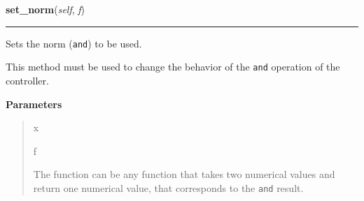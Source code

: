     \begin{boxedminipage}{\textwidth}

    \raggedright \textbf{set\_norm}(\textit{self}, \textit{f})

    \vspace{-1.5ex}

    \rule{\textwidth}{0.5\fboxrule}

Sets the norm (\texttt{and}) to be used.

This method must be used to change the behavior of the \texttt{and} operation
of the controller.
    \vspace{1ex}

      \textbf{Parameters}
      \begin{quote}
        \begin{Ventry}{x}

          \item[f]


The function can be any function that takes two numerical values and
return one numerical value, that corresponds to the \texttt{and} result.
        \end{Ventry}

      \end{quote}

    \vspace{1ex}

    \end{boxedminipage}

    \label{peach:fuzzy:control:Controller:set_conorm}

    \vspace{0.5ex}

